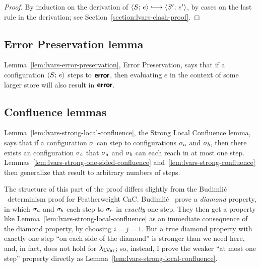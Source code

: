 \LVarsLemClash
\begin{proof}
  By induction on the derivation of $\config{S}{e} \parstepsto
  \config{S'}{e'}$, by cases on the last rule in the derivation; see
  Section~\ref{section:lvars-clash-proof}.
\end{proof}

\subsection{Error Preservation lemma}

Lemma~\ref{lem:lvars-error-preservation}, Error Preservation, says
that if a configuration $\langle S;\, e \rangle$ steps to $\textbf{\textsf{error}}$, then
evaluating $e$ in the context of some larger store will also result in
$\textbf{\textsf{error}}$.


\LVarsLemErrorPreservation


\subsection{Confluence lemmas}\label{subsection:lvars-confluence}

Lemma~\ref{lem:lvars-strong-local-confluence}, the Strong Local
Confluence lemma, says that if a configuration $\sigma$ can step to
configurations $\sigma_a$ and $\sigma_b$, then there exists an
configuration $\sigma_c$ that $\sigma_a$ and $\sigma_b$ can each reach in
at most one step.  Lemmas~\ref{lem:lvars-strong-one-sided-confluence}
and~\ref{lem:lvars-strong-confluence} then generalize that result to
arbitrary numbers of steps.

The structure of this part of the proof differs slightly from the
Budimli\'c \etal~determinism proof for Featherweight CnC.  Budimli\'c
\etal~prove a \emph{diamond} property, in which $\sigma_a$ and
$\sigma_b$ each step to $\sigma_c$ in \emph{exactly} one step.  They
then get a property like Lemma~\ref{lem:lvars-strong-local-confluence}
as an immediate consequence of the diamond property, by choosing $i =
j = 1$.  But a true diamond property with exactly one step ``on each
side of the diamond'' is stronger than we need here, and, in fact,
does not hold for $\lambda_{\textrm{LVar}}$; so, instead, I prove the weaker ``at
most one step'' property directly as
Lemma~\ref{lem:lvars-strong-local-confluence}.

